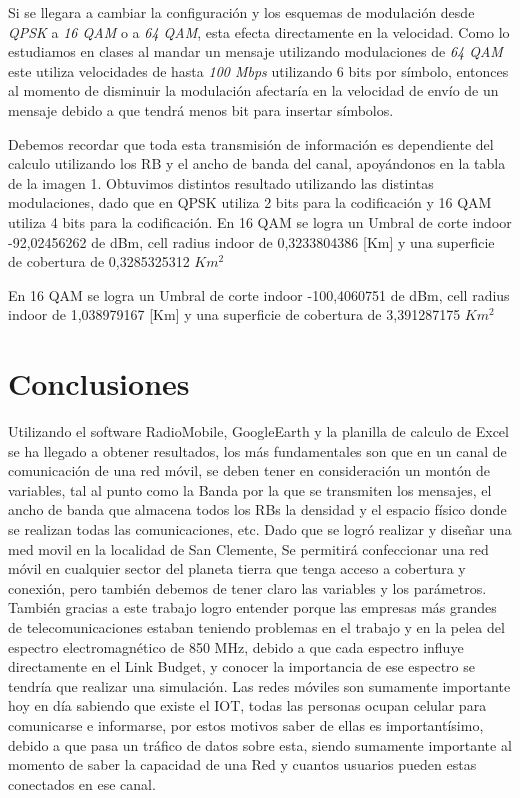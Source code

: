 \documentclass[Article, letterpaper,12pt]{article}
\begin{document}
Si se llegara a cambiar la configuración y los esquemas de modulación desde \textit{QPSK} a \textit{16 QAM} o a \textit{64 QAM}, esta efecta directamente en la velocidad. Como lo estudiamos en clases al mandar un mensaje utilizando modulaciones de \textit{64 QAM} este utiliza velocidades de hasta \textit{100 Mbps} utilizando 6 bits por símbolo, entonces al momento de disminuir la modulación afectaría en la velocidad de envío de un mensaje debido a que tendrá menos bit para insertar símbolos.

Debemos recordar que toda esta transmisión de información es dependiente del calculo utilizando los RB y el ancho de banda del canal, apoyándonos en la tabla de la imagen 1.
Obtuvimos distintos resultado utilizando las distintas modulaciones, dado que en QPSK utiliza 2 bits para la codificación y 16 QAM utiliza 4 bits para la codificación.
En 16 QAM se logra un Umbral de corte indoor -92,02456262 de dBm, cell radius indoor de 0,3233804386 [Km] y una superficie de cobertura	de 0,3285325312 $Km^{2}$

En 16 QAM se logra un Umbral de corte indoor -100,4060751 de dBm, cell radius indoor de 1,038979167 [Km] y una superficie de cobertura	de 3,391287175 $Km^{2}$





\section{Conclusiones}

Utilizando el software RadioMobile, GoogleEarth y la planilla de calculo de Excel se ha llegado a obtener resultados, los más fundamentales son que en un canal de comunicación de una red móvil, se deben tener en consideración un montón de variables, tal al punto como la Banda por la que se transmiten los mensajes, el ancho de banda que almacena todos los RBs la densidad y el espacio físico donde se realizan todas las comunicaciones, etc.
Dado que se logró realizar y diseñar una med movil en la localidad de San Clemente, Se permitirá confeccionar una red móvil en cualquier sector del planeta tierra que tenga acceso a cobertura y conexión, pero también debemos de tener claro las variables y los parámetros. También gracias a este trabajo logro entender porque las empresas más grandes de telecomunicaciones estaban teniendo problemas en el trabajo y en la pelea del espectro electromagnético de 850 MHz, debido a que cada espectro influye directamente en el Link Budget, y conocer la importancia de ese espectro se tendría que realizar una simulación. 
Las redes móviles son sumamente importante hoy en día sabiendo que existe el IOT, todas las personas ocupan celular para comunicarse e informarse, por estos motivos saber de ellas es importantísimo, debido a que pasa un tráfico de datos sobre esta, siendo sumamente importante al momento de saber la capacidad de una Red y cuantos usuarios pueden estas conectados en ese canal.
\end{document}
